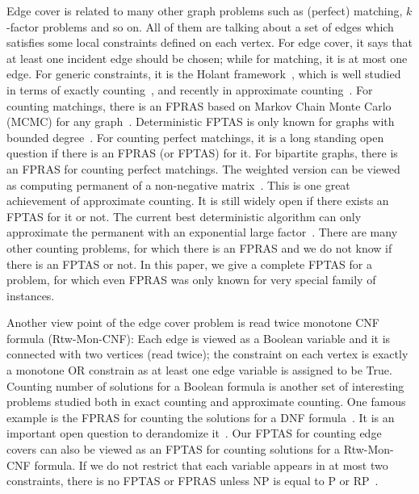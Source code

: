 Edge cover is related to many other graph problems such as (perfect) matching, $k$-factor problems and so on. All of them are talking about a set of edges which satisfies some local constraints defined on each vertex. For edge cover, it says that at least one incident edge should be chosen; while for matching, it is at most one edge. For generic constraints, it is the Holant framework~\cite{STOC09,holant}, which is well studied in terms of exactly counting~\cite{holant,HuangL12,CaiGW13}, and recently in approximate counting~\cite{YZ13,McQuillan2013,fibo-approx}. For counting matchings, there is an FPRAS based on Markov Chain Monte Carlo (MCMC) for any graph~\cite{jerrum1989approximating}. Deterministic FPTAS is only known for graphs with bounded degree~\cite{BGKNT07}. For counting perfect matchings, it is a long standing open question if there is an FPRAS (or FPTAS) for it. For bipartite graphs, there is an FPRAS for counting perfect matchings. The weighted version can be viewed as  computing permanent of a non-negative matrix~\cite{app_JSV04}. This is one great achievement of approximate counting. It is still widely open if there exists an FPTAS for it or not. The current best deterministic algorithm can only approximate the permanent with an exponential large factor~\cite{linial1998deterministic,gamarnik2010deterministic}. There are many other counting problems, for which there is an FPRAS and we do not know if there is an FPTAS or not. In this paper, we give a complete FPTAS for a problem, for which even FPRAS was only known for very special family of instances.

Another view point of the edge cover problem is read twice monotone CNF formula (Rtw-Mon-CNF): Each edge is viewed as a Boolean variable and it is connected with two vertices (read twice); the constraint on each vertex is exactly a monotone OR constrain as at least one edge variable is assigned to be True. Counting number of solutions for a Boolean formula is another set of interesting problems studied both in exact counting and approximate counting. One famous example is the FPRAS for counting the solutions for a  DNF formula~\cite{KarpL83,KarpLM89}. It is an important open question to derandomize it~\cite{Trevisan04,gopalan2012dnf}. Our FPTAS for counting edge covers can also be viewed as an FPTAS for counting solutions for a  Rtw-Mon-CNF formula. If we do not restrict that each variable appears in at most two constraints, there is no FPTAS or FPRAS unless NP is equal to P or RP~\cite{dicho_DGJ10}.

